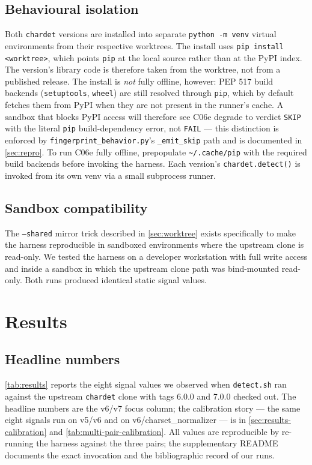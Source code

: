 \documentclass[11pt,letterpaper]{article}
\begin{document}
\subsection{Behavioural isolation}
\label{sec:venv}
Both \texttt{chardet} versions are installed into separate
\texttt{python -m venv} virtual environments from their respective
worktrees. The install uses \texttt{pip install <worktree>}, which
points \texttt{pip} at the local source rather than at the PyPI
index. The version's library code is therefore taken from the
worktree, not from a published release. The install is \emph{not}
fully offline, however: PEP 517 build backends
(\texttt{setuptools}, \texttt{wheel}) are still resolved through
\texttt{pip}, which by default fetches them from PyPI when they are
not present in the runner's cache. A sandbox that blocks PyPI
access will therefore see C06e degrade to verdict \texttt{SKIP}
with the literal \texttt{pip} build-dependency error, not
\texttt{FAIL} --- this distinction is enforced by
\texttt{fingerprint\_behavior.py}'s \texttt{\_emit\_skip} path and
is documented in \cref{sec:repro}. To run C06e fully
offline, prepopulate \texttt{\~{}/.cache/pip} with the required
build backends before invoking the harness. Each version's
\texttt{chardet.detect()} is invoked from its own venv via a small
subprocess runner.

\subsection{Sandbox compatibility}
\label{sec:sandbox}
The \texttt{--shared} mirror trick described in \cref{sec:worktree}
exists specifically to make the harness reproducible in sandboxed
environments where the upstream clone is read-only. We tested the
harness on a developer workstation with full write access and inside
a sandbox in which the upstream clone path was bind-mounted
read-only. Both runs produced identical static signal values.

\section{Results}
\label{sec:results}

\subsection{Headline numbers}
\label{sec:headline}

\cref{tab:results} reports the eight signal values we observed when
\texttt{detect.sh} ran against the upstream \texttt{chardet} clone with
tags 6.0.0 and 7.0.0 checked out. The headline numbers are the v6/v7
focus column; the calibration story --- the same eight signals run
on v5/v6 and on v6/charset\_normalizer --- is in
\cref{sec:results-calibration} and \cref{tab:multi-pair-calibration}.
All values are reproducible by re-running the harness against the
three pairs; the supplementary README documents the exact invocation
and the bibliographic record of our runs.
\end{document}
